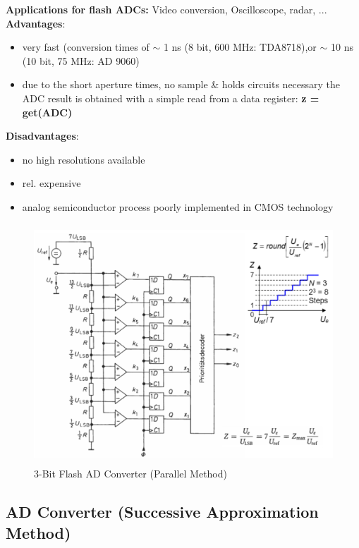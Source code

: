 \textbf{Applications for flash ADCs:} Video conversion, Oscilloscope, radar, ...\\

\textbf{Advantages}: 

\begin{itemize}
\item  very fast (conversion times of $\mathrm{\sim}$ 1 ns (8 bit, 600 MHz: TDA8718),or $\mathrm{\sim}$ 10 ns (10 bit, 75 MHz: AD 9060)
\item  due to the short aperture times, no sample \& holds circuits necessary the ADC result is obtained with a simple read from a data register: \textbf{z = get(ADC)}
\end{itemize}

\textbf{Disadvantages}:

\begin{itemize}
\item  no high resolutions available
\item  rel. expensive 
\item  analog semiconductor process  poorly implemented in CMOS technology
\end{itemize}

    \begin{figure}[h]
    \centering
    \includegraphics[width=15cm, height=9cm]{Images/image175.png}
    \caption{3-Bit Flash AD Converter (Parallel Method)}
    \label{fig:Fig 129}
    \end{figure}

\subsection{AD Converter (Successive Approximation Method)}


